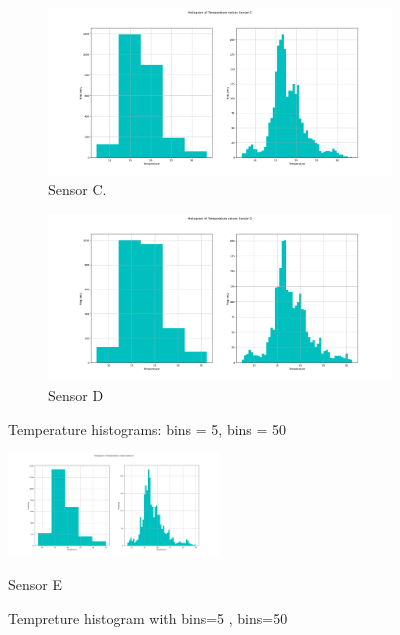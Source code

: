 \documentclass[a4paper]{article}
\begin{document}
        \begin{figure}[H]
            \centering
            \begin{subfigure}[b]{0.4\linewidth}
              \includegraphics[width=\linewidth]{images/Histogram_of_Temperature_values_Sensor_C.png}
              \caption{Sensor C.}
            \end{subfigure}
            \begin{subfigure}[b]{0.4\linewidth}
              \includegraphics[width=\linewidth]{images/Histogram_of_Temperature_values_Sensor_D.png}
              \caption{Sensor D}
            \end{subfigure}
            \caption{Temperature histograms: bins = 5, bins = 50}
            \label{fig:Histogram}
        \end{figure} 


        \begin{figure}[H]
        \centering
            \includegraphics[width=0.5\textwidth]{images/Histogram_of_Temperature_values_Sensor_E.png}
            \caption{Sensor E}
            \caption{Tempreture histogram with bins=5 , bins=50}
            \label{fig:Histogram}
        \end{figure}
    
\end{document}
